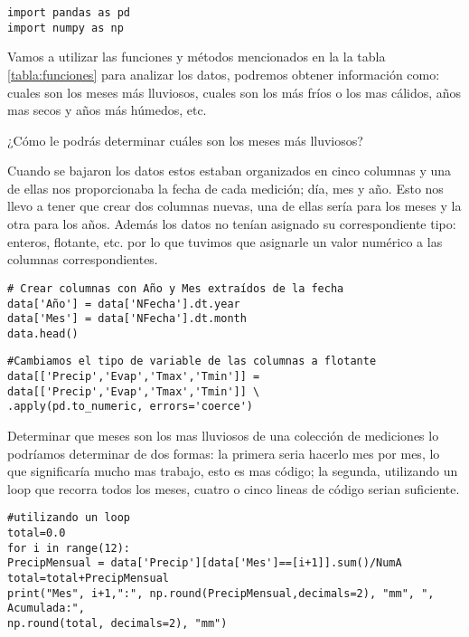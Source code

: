 \documentclass[12pt,a4paper]{article}
\begin{document}
\begin{verbatim}
import pandas as pd
import numpy as np
\end{verbatim}

\noindent Vamos a utilizar las funciones y métodos mencionados en la la tabla \ref{tabla:funciones} para analizar los datos, podremos obtener información como: cuales son los meses más lluviosos, cuales son los más fríos o los mas cálidos, años mas secos y años más húmedos, etc. 

¿Cómo le podrás determinar cuáles son los meses más lluviosos?

\noindent Cuando se bajaron los datos estos estaban organizados en cinco columnas y una de ellas nos proporcionaba la fecha de cada medición; día, mes y año. Esto nos llevo a tener que crear dos columnas nuevas, una de ellas sería para los meses y la otra para los años. Además los datos no tenían asignado su correspondiente tipo: enteros, flotante, etc. 
por lo que tuvimos que asignarle un valor numérico a las columnas correspondientes.

\begin{verbatim}
# Crear columnas con Año y Mes extraídos de la fecha 
data['Año'] = data['NFecha'].dt.year
data['Mes'] = data['NFecha'].dt.month
data.head()
\end{verbatim}

\begin{verbatim}
#Cambiamos el tipo de variable de las columnas a flotante
data[['Precip','Evap','Tmax','Tmin']] = data[['Precip','Evap','Tmax','Tmin']] \
.apply(pd.to_numeric, errors='coerce')
\end{verbatim}

\noindent Determinar que meses son los mas lluviosos de una colección de mediciones lo podríamos determinar de dos formas: la primera seria hacerlo mes por mes, lo que significaría mucho mas trabajo, esto es mas código; la segunda, utilizando un loop que recorra todos los meses, cuatro o cinco lineas de código serian suficiente.

\begin{verbatim}
#utilizando un loop
total=0.0
for i in range(12):
PrecipMensual = data['Precip'][data['Mes']==[i+1]].sum()/NumA
total=total+PrecipMensual
print("Mes", i+1,":", np.round(PrecipMensual,decimals=2), "mm", ", Acumulada:", 
np.round(total, decimals=2), "mm")
\end{verbatim}
\end{document}
